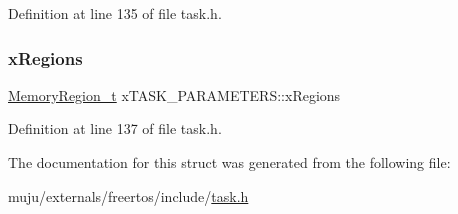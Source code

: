 Definition at line 135 of file task.\+h.

\mbox{\label{structx_t_a_s_k___p_a_r_a_m_e_t_e_r_s_a9641d492bae4c00132842f54700f9fcc}} 
\subsubsection{\texorpdfstring{x\+Regions}{xRegions}}
{\footnotesize\ttfamily \hyperlink{externals_2freertos_2include_2task_8h_af609504de4d78ff6f71477ae47c66e51}{Memory\+Region\+\_\+t} x\+T\+A\+S\+K\+\_\+\+P\+A\+R\+A\+M\+E\+T\+E\+R\+S\+::x\+Regions}



Definition at line 137 of file task.\+h.



The documentation for this struct was generated from the following file\+:\begin{DoxyCompactItemize}
\item 
muju/externals/freertos/include/\hyperlink{externals_2freertos_2include_2task_8h}{task.\+h}\end{DoxyCompactItemize}
